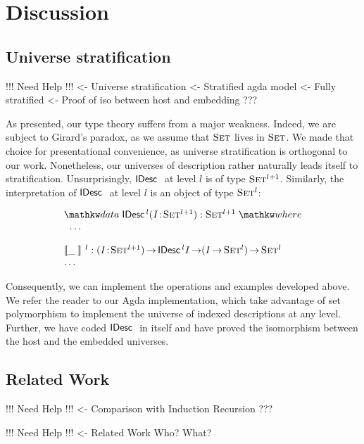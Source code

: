\section{Discussion}
\label{sec:discussion}

\subsection{Universe stratification}

\begin{wstructure}
!!! Need Help !!!
<- Universe stratification
    <- Stratified agda model
        <- Fully stratified
        <- Proof of iso between host and embedding
    ???
\end{wstructure}

As presented, our type theory suffers from a major weakness. Indeed,
we are subject to Girard's paradox, as we assume that $\Set$ lives in
$\Set$. We made that choice for presentational convenience, as
universe stratification is orthogonal to our work. Nonetheless, our
universes of description rather naturally leads itself to
stratification. Unsurprisingly, $\IDesc{}$ at level $l$ is of type
$\Set^{\blue{l+1}}$. Similarly, the interpretation of $\IDesc{}$ at
level $l$ is an object of type $\Set^{\blue{l}}$:

\[\stk{
\data \IDesc{\!}^{\blue{l}} (\Bhab{\V{I}}{\Set^{\blue{l+1}}}) : \Set^{\blue{l+1}} \where \\
\;\;\ldots \\
\\
\idescop{\_\:}{}{}^{\blue{l}} : \PI{\V{I}}{\Set^{\blue{l+1}}} \IDesc{{\!}^{\blue{l}}I} \To (\V{I} \To \Set^{\blue{l}}) \To \Set^{\blue{l}}    \\
\ldots
}\]

Consequently, we can implement the operations and examples developed
above. We refer the reader to our Agda implementation, which take
advantage of set polymorphism to implement the universe of indexed
descriptions at any level. Further, we have coded $\IDesc{}$ in itself
and have proved the isomorphism between the host and the embedded
universes.

\subsection{Related Work}

\begin{structure}
!!! Need Help !!!
<- Comparison with Induction Recursion
    ???
\end{structure}


\begin{wstructure}
!!! Need Help !!!
<- Related Work
    Who? What?
\end{wstructure}

